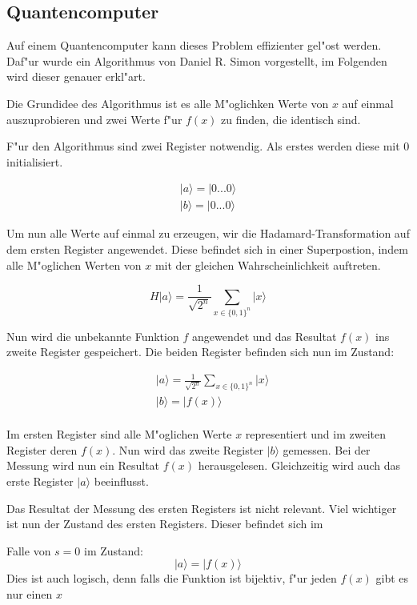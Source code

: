\begin{refsection}
\subsection{Quantencomputer}

Auf einem Quantencomputer kann dieses Problem effizienter gel"ost werden.
Daf"ur wurde ein Algorithmus von Daniel R. Simon vorgestellt, im Folgenden wird
dieser genauer erkl"art.


Die Grundidee des Algorithmus ist es alle M"oglichken Werte von $x$ auf einmal
auszuprobieren und zwei Werte f"ur $f(x)$ zu finden, die identisch sind.

F"ur den Algorithmus sind zwei Register notwendig. Als erstes werden diese mit
0 initialisiert.

\begin{align*}
    |a\rangle=|0 ... 0 \rangle 
    \\
    |b\rangle=|0 ... 0 \rangle 
\end{align*}

Um nun alle Werte auf einmal zu erzeugen, wir die Hadamard-Transformation auf
dem ersten Register angewendet. Diese befindet sich in einer Superpostion,
indem alle M"oglichen Werten von $x$ mit der gleichen Wahrscheinlichkeit
auftreten.

\[ 
    H|a\rangle=\frac{1}{\sqrt{2^n}} \sum_{x\in\{0,1\}^n}{|x\rangle}
\]
 
Nun wird die unbekannte Funktion $f$ angewendet und das Resultat $f(x)$ ins
zweite Register gespeichert. Die beiden Register befinden sich nun im Zustand:

\begin{align*}
  & |a\rangle = \frac{1}{\sqrt{2^n}} \sum_{x\in\{0,1\}^n} {|x\rangle} \\
  & |b\rangle = |f(x)\rangle \\
\end{align*}

Im ersten Register sind alle M"oglichen Werte $x$ representiert und im zweiten
Register deren $f(x)$. Nun wird das zweite Register $|b\rangle$ gemessen. Bei
der Messung wird nun ein Resultat $f(x)$ herausgelesen. Gleichzeitig wird auch
das erste Register $|a\rangle$ beeinflusst.

Das Resultat der Messung des ersten Registers ist nicht relevant. Viel
wichtiger ist nun der Zustand des ersten Registers. Dieser befindet sich im

Falle von $s = 0$ im Zustand:
\[
    |a\rangle = |f(x)\rangle
\]
Dies ist auch logisch, denn falls  die Funktion ist bijektiv, f"ur jeden $f(x)$
gibt es nur einen $x$


\end{refsection}

